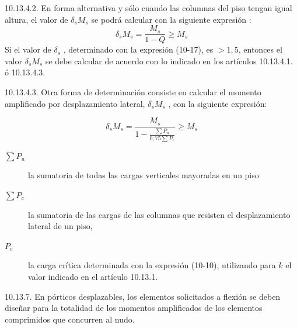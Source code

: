 \documentclass[twocolumn]{article}
\begin{document}
10.13.4.2. En forma alternativa y sólo cuando las columnas del piso tengan igual altura, el
valor de $\delta_s M_s$ se podrá calcular con la siguiente expresión :
\[
\delta_{s} M_{s}=\frac{M_{s}}{1-Q} \geq M_{s}
\]
Si el valor de $\delta_s$ , determinado con la expresión (10-17), es $> 1,5$, entonces el valor $\delta_s M_s$
se debe calcular de acuerdo con lo indicado en los artículos 10.13.4.1. ó 10.13.4.3.

10.13.4.3. Otra forma de determinación consiste en calcular el momento amplificado por
desplazamiento lateral, $\delta_s M_s$ , con la siguiente expresión:

\[
\delta_{s} M_{s}=\frac{M_{s}}{1-\frac{\sum P_{u}}{0,75 \sum P_{c}}} \geq M_{s}
\]

\begin{description}
	\item[$\sum P_u$] la sumatoria de todas las cargas verticales mayoradas en un piso
	\item[$\sum P_c$] la sumatoria de las cargas de las columnas que resisten el desplazamiento
	lateral de un piso,
	\item[$P_c$] la carga crítica determinada con la expresión (10-10), utilizando para $k$ el
	valor indicado en el artículo 10.13.1.
\end{description}

10.13.7. En pórticos desplazables, los elementos solicitados a flexión se deben diseñar
para la totalidad de los momentos amplificados de los elementos comprimidos que
concurren al nudo.
\end{document}
